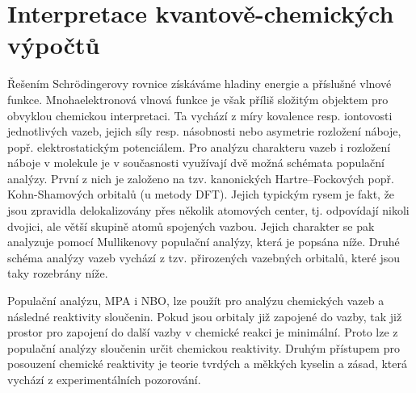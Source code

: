 \documentclass[
  digital, %
  table,   %
  lof,     %
  lot,     %
  oneside,
]{fithesis3}
\begin{document}
\section{Interpretace kvantově-chemických výpočtů}
Řešením Schrödingerovy rovnice získáváme hladiny energie a příslušné vlnové funkce. Mnohaelektronová vlnová funkce je však příliš složitým objektem pro obvyklou chemickou interpretaci. Ta vychází z míry kovalence resp. iontovosti jednotlivých vazeb, jejich síly resp. násobnosti nebo asymetrie rozložení náboje, popř. elektrostatickým potenciálem. Pro analýzu charakteru vazeb i rozložení náboje v molekule je v současnosti využívají dvě možná schémata populační analýzy. První z nich je založeno na tzv. kanonických Hartre--Fockových popř. Kohn-Shamových orbitalů (u metody DFT). Jejich typickým rysem je fakt, že jsou zpravidla delokalizovány přes několik atomových center, tj. odpovídají nikoli dvojici, ale větší skupině atomů spojených vazbou. Jejich charakter se pak analyzuje pomocí Mullikenovy populační analýzy, která je popsána níže. Druhé schéma analýzy vazeb vychází z tzv. přirozených vazebných orbitalů, které jsou taky rozebrány níže.

Populační analýzu, MPA i NBO, lze použít pro analýzu chemických vazeb a následné reaktivity sloučenin. Pokud jsou orbitaly již zapojené do vazby, tak již prostor pro zapojení do další vazby v chemické reakci je minimální. Proto lze z populační analýzy sloučenin určit chemickou reaktivity. Druhým přístupem pro posouzení chemické reaktivity je teorie tvrdých a měkkých kyselin a zásad, která vychází z experimentálních pozorování.
\end{document}
